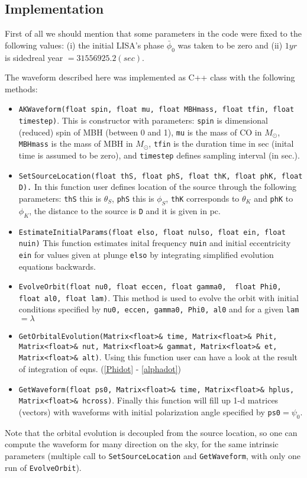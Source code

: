 \documentclass[11pt]{report}
\begin{document}
\subsection{Implementation}

First of all we should mention that some parameters in the code 
were fixed to the following values:
(i) the initial LISA's phase $\bar{\phi}_0$ was taken to be zero 
and (ii) $1yr$ is sidedreal year $= 31556925.2 (sec)$.

The waveform described here was implemented as C++ class with 
the following methods:
\begin{itemize}
\item {\tt AKWaveform(float spin, float mu, float MBHmass, float tfin, float timestep)}. This is constructor with parameters: {\tt spin}  is dimensional (reduced) spin of MBH (between 0 and 1), {\tt mu} is the mass of CO in $M_{\odot}$, {\tt MBHmass} is the mass of MBH
in $M_{\odot}$, {\tt tfin} is the duration time in sec (inital time is assumed to be zero), and {\tt timestep} defines sampling interval 
(in sec.). 
\item {\tt SetSourceLocation(float thS, float phS,  float thK, float phK, float D).} In this function user defines location of the source through
the following parameters: {\tt thS} this is $\theta_S$, {\tt phS}
this is $\phi_S$, {\tt thK} corresponds to $\theta_K$ and 
{\tt phK} to $\phi_K$, the distance to the source is {\tt D} and
it is given in pc.

\item {\tt EstimateInitialParams(float elso, float nulso, float ein, 
float nuin)}
This function estimates inital frequency {\tt nuin} and initial
eccentricity {\tt ein} for values given at plunge {\tt elso}
by integrating simplified evolution equations backwards.

\item {\tt EvolveOrbit(float nu0, float eccen, float gamma0, \
		    float Phi0, float al0, float lam)}. This method is used 
to evolve the orbit with initial conditions specified by 
{\tt nu0, eccen, gamma0, Phi0, al0} and for a given {\tt lam} 
$= \lambda$ 

\item {\tt GetOrbitalEvolution(Matrix<float>\& time, Matrix<float>\& Phit, Matrix<float>\& nut,  Matrix<float>\& gammat, Matrix<float>\& et, Matrix<float>\& alt)}. Using this function user can have a look at the result of integration of eqns. (\ref{Phidot} - \ref{alphadot})

\item {\tt GetWaveform(float ps0, Matrix<float>\& time, Matrix<float>\& hplus,  Matrix<float>\& hcross)}. Finally this function will 
fill up 1-d matrices (vectors) with waveforms with initial 
polarization angle specified by {\tt ps0}$= \psi_0$.
\end{itemize}
Note that the orbital evolution is decoupled from the source location,
so one can compute the waveform for many direction on the sky, 
for the same intrinsic parameters (multiple call to {\tt SetSourceLocation} and {\tt GetWaveform}, with only one run of
{\tt EvolveOrbit}).
\end{document}
